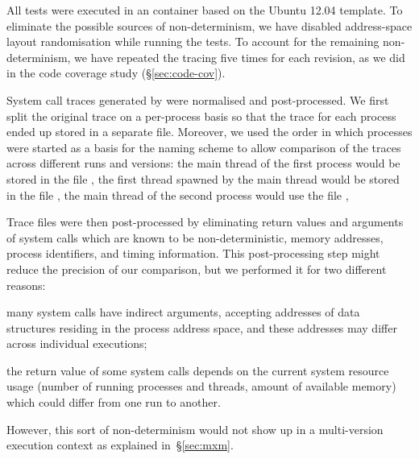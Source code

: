 All tests were executed in an \lxc container based on the Ubuntu 12.04
template.  To eliminate the possible sources of non-determinism, we have
disabled address-space layout randomisation while running the tests. To
account for the remaining non-determinism, we have repeated the tracing five
times for each revision, as we did in the code coverage
study (\S\ref{sec:code-cov}).

System call traces generated by \perf were normalised and
post-processed. We first split the original trace on a per-process basis so
that the trace for each process ended up stored in a separate file.
Moreover, we used the order in which processes were started as a basis for the
naming scheme to allow comparison of the traces across different runs and
versions: the main thread of the first process would be stored in the file
, the first thread spawned by the main thread would be
stored in the file , the main thread of the second
process would use the file , \etc


Trace files were then post-processed by eliminating return values and arguments
of system calls which are known to be non-deterministic, \ie memory addresses,
process identifiers, and timing information. This post-processing step
might reduce the precision of our comparison, but we performed it for two
different reasons:%
\begin{inparaenum}[(1)]
\item many system calls have indirect arguments, accepting addresses of data
  structures residing in the process address space, and these addresses may
  differ across individual executions;
\item the return value of some system calls depends on the current system
  resource usage (\eg number of running processes and threads, amount of
  available memory) which could differ from one run to another.
\end{inparaenum}
However, this sort of non-determinism would not show up in a multi-version
execution context as explained in~\S\ref{sec:mxm}.

